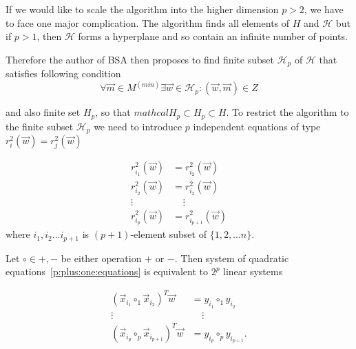 If we would like to scale the algorithm into the higher dimension $p > 2$, we have to face one major complication. The algorithm finds all elements of $H$ and $\mathcal{H}$ but if $p > 1$, then  $\mathcal{H}$ forms a hyperplane and so contain an infinite number of points.

Therefore the author of BSA then proposes to find finite subset $\mathcal{H}_p$ of $\mathcal{H}$ that satisfies following condition
\begin{equation} \label{hp:set:condition}
    \forall \vec{m} \in M^{(min)} \exists \vec{w} \in \mathcal{H}_p : (\vec{w},\vec{m}) \in Z
\end{equation}

and also finite set $H_p$, so that $mathcal{H}_p \subset H_p \subset H$.
To restrict the algorithm to the finite subset $\mathcal{H}_p$ we need to introduce $p$ independent equations of type
$ r^{2}_i(\vec{w}) = r^{2}_j(\vec{w})$

\begin{align} 
    r^{2}_{i_1}(\vec{w}) &= r^{2}_{i_2}(\vec{w}) \label{p:plus:one:equations}   \\
    r^{2}_{i_2}(\vec{w}) &= r^{2}_{i_3}(\vec{w}) \nonumber  \\
    \vdots \ \ \  & \ \ \ \  \ \vdots  \nonumber \\ 
    r^{2}_{i_p}(\vec{w}) &=  r^{2}_{i_{p+1}}(\vec{w}) \nonumber 
\end{align}
where $i_1, i_2 \ldots i_{p+1}$  is $(p+1)$-element subset of $\{{1, 2, \ldots n \}}$.


Let $\circ \in {+, -}$ be either operation $+$ or $-$. Then system of quadratic equations~\eqref{p:plus:one:equations} is equivalent to $2^p$ linear systems

\begin{align} 
    (\vec{x}_{i_1} \circ_1 \vec {x}_{i_2} )^T \vec{w} &= y_{i_1} \circ_1 y_{i_2} \label{p:plus:one:equations:linear}   \\
    \vdots \ \ \  & \ \ \ \  \ \vdots  \nonumber \\ 
    (\vec{x}_{i_p} \circ_p \vec {x}_{i_{p+1}} )^T \vec{w} &= y_{i_p} \circ_p y_{i_{p+1}}. \nonumber 
\end{align}


